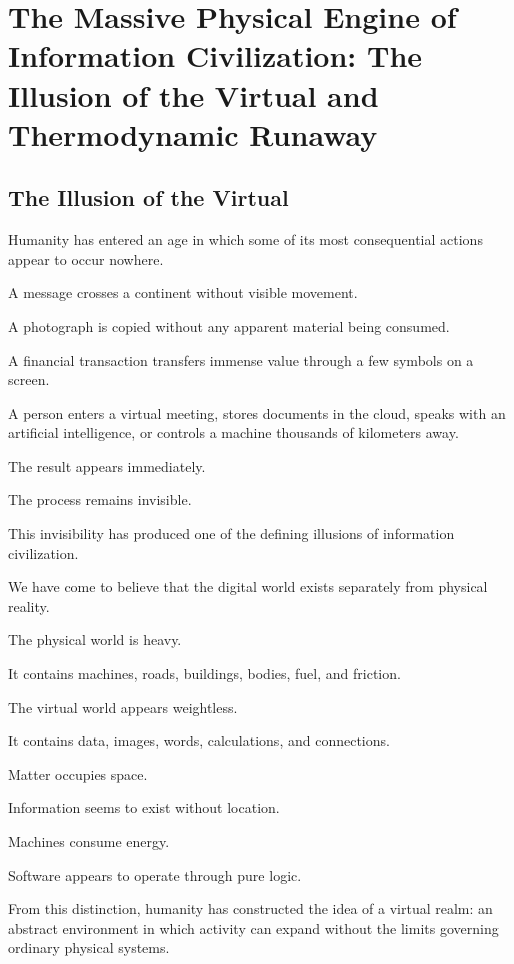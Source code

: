 

\section{The Massive Physical Engine of Information Civilization: The Illusion of the Virtual and Thermodynamic Runaway}

\subsection*{\textbf{The Illusion of the Virtual}} 

Humanity has entered an age in which some of its most consequential actions appear to occur nowhere.

A message crosses a continent without visible movement.

A photograph is copied without any apparent material being consumed.

A financial transaction transfers immense value through a few symbols on a screen.

A person enters a virtual meeting, stores documents in the cloud, speaks with an artificial intelligence, or controls a machine thousands of kilometers away.

The result appears immediately.

The process remains invisible.

This invisibility has produced one of the defining illusions of information civilization.

We have come to believe that the digital world exists separately from physical reality.

The physical world is heavy.

It contains machines, roads, buildings, bodies, fuel, and friction.

The virtual world appears weightless.

It contains data, images, words, calculations, and connections.

Matter occupies space.

Information seems to exist without location.

Machines consume energy.

Software appears to operate through pure logic.

From this distinction, humanity has constructed the idea of a virtual realm: an abstract environment in which activity can expand without the limits governing ordinary physical systems.

